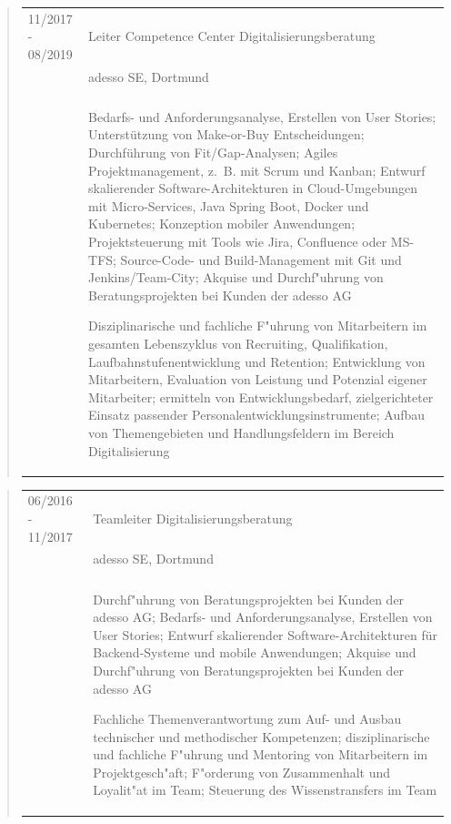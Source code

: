 	\begin{quote}
		\begin{tabular}{p{4cm}l}
			11/2017 - 08/2019&Leiter Competence Center Digitalisierungsberatung\\
			&adesso SE, Dortmund\\
			\\
			&\begin{minipage}{10cm}
				Bedarfs- und Anforderungsanalyse, Erstellen von User Stories; Unterstützung von Make-or-Buy Entscheidungen; Durchführung von Fit/Gap-Analysen; Agiles Projektmanagement, z.~B. mit Scrum und Kanban; Entwurf skalierender Software-Architekturen in Cloud-Umgebungen mit Micro-Services, Java Spring Boot, Docker und Kubernetes; Konzeption mobiler Anwendungen; Projektsteuerung mit Tools wie Jira, Confluence oder MS-TFS; Source-Code- und Build-Management mit Git und Jenkins/Team-City; Akquise und Durchf"uhrung von Beratungsprojekten bei Kunden der adesso AG\newline
				
				Disziplinarische und fachliche F"uhrung von Mitarbeitern im gesamten Lebenszyklus von Recruiting, Qualifikation, Laufbahnstufenentwicklung und Retention; Entwicklung von Mitarbeitern, Evaluation von Leistung und Potenzial eigener Mitarbeiter; ermitteln von  Entwicklungsbedarf, zielgerichteter Einsatz passender Personalentwicklungsinstrumente; Aufbau von Themengebieten und Handlungsfeldern im Bereich Digitalisierung %
			\end{minipage}
		\end{tabular}
	\end{quote}
	\begin{quote}
		\begin{tabular}{p{4cm}l}
			06/2016 - 11/2017&Teamleiter Digitalisierungsberatung\\
			&adesso SE, Dortmund\\
			\\
			&\begin{minipage}{10cm}
				Durchf"uhrung von Beratungsprojekten bei Kunden der adesso AG; Bedarfs- und Anforderungsanalyse, Erstellen von User Stories; Entwurf skalierender Software-Architekturen für Backend-Systeme und mobile Anwendungen;	Akquise und Durchf"uhrung von Beratungsprojekten bei Kunden der adesso AG\newline
				
				Fachliche Themenverantwortung zum Auf- und Ausbau technischer und methodischer Kompetenzen; disziplinarische und fachliche F"uhrung und Mentoring von Mitarbeitern im Projektgesch"aft; F"orderung von Zusammenhalt und Loyalit"at im Team; Steuerung des Wissenstransfers im Team%
			\end{minipage}
		\end{tabular}
	\end{quote}
